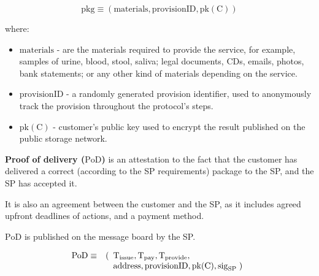 \documentclass{ieeeaccess}
\begin{document}
$$\mathrm{pkg} \equiv (\mathrm{materials}, \mathrm{provisionID}, \mathrm{pk(C)})$$

where:

\begin{itemize}

\item $\mathrm{materials}$ - are the materials required to provide the service, for example, samples of urine, blood, stool, saliva; legal documents, CDs, emails, photos, bank statements; or any other kind of materials depending on the service.
\item $\mathrm{provisionID}$ - a randomly generated provision identifier, used to anonymously track the provision throughout the protocol's steps.
\item $\mathrm{pk(C)}$ - customer's public key used to encrypt the result published on the public storage network.
\end{itemize}

\noindent \textbf
{Proof of delivery ($\mathrm{PoD}$)}\label{proof-of-delivery} is an attestation to the fact that the customer has delivered a correct (according to the SP requirements) package to the SP, and the SP has accepted it.

It is also an agreement between the customer and the SP, as it includes agreed upfront deadlines of actions, and a payment method.

$\mathrm{PoD}$ is published on the message board by the SP.

\begin{eqnarray}
\mathrm{PoD} & \equiv & (\begin{array}[t]{l}\mathrm{T}_\mathrm{issue}, \mathrm{T}_\mathrm{pay}, \mathrm{T}_\mathrm{provide},\\ \mathrm{address}, \mathrm{provisionID}, \mathrm{pk(C)}, \mathrm{sig}_\mathrm{SP} \; )\end{array}
\end{eqnarray}

\end{document}
